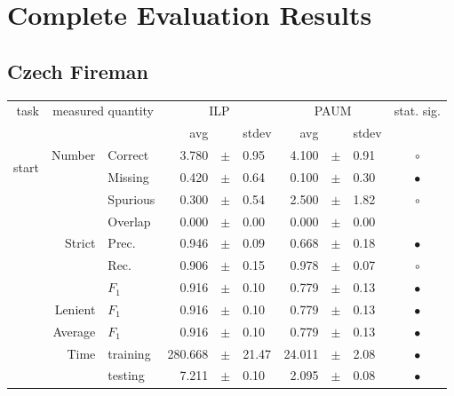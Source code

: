 \appendix
\chapter{Complete Evaluation Results}

\section{Czech Fireman}

\begin{longtable}{|r|r|l||rcl|rcl|c|}
\hline
\multirow{2}{*}{task} & \multicolumn{2}{|c||}{\multirow{2}{*}{measured quantity}} & \multicolumn{3}{|c|}{ILP} & \multicolumn{3}{|c|}{PAUM} & \multirow{2}{*}{ stat. sig.}\\
\cline{4-9}
  & \multicolumn{2}{|c||}{} &  avg  &    &  stdev  &  avg  &    &  stdev  & \\
\hline
\endhead
\hline
\hline
\multirow{11}{*}{\begin{sideways}start\end{sideways} } 
& \multirow{4}{*}{Number} &  Correct  & 3.780 &  $\pm$  & 0.95 & 4.100 &  $\pm$  & 0.91 &  $\circ$\\
\cline{3-10}
 &  &  Missing  & 0.420 &  $\pm$  & 0.64 & 0.100 &  $\pm$  & 0.30 &  $\bullet$\\
\cline{3-10}
 &  &  Spurious  & 0.300 &  $\pm$  & 0.54 & 2.500 &  $\pm$  & 1.82 &  $\circ$\\
\cline{3-10}
 &  &  Overlap  & 0.000 &  $\pm$  & 0.00 & 0.000 &  $\pm$  & 0.00 &   \\
\cline{2-10}
 & \multirow{3}{*}{Strict} &  Prec.  & 0.946 &  $\pm$  & 0.09 & 0.668 &  $\pm$  & 0.18 &  $\bullet$\\
\cline{3-10}
 &  &  Rec.  & 0.906 &  $\pm$  & 0.15 & 0.978 &  $\pm$  & 0.07 &  $\circ$\\
\cline{3-10}
 &  &  $F_1$  & 0.916 &  $\pm$  & 0.10 & 0.779 &  $\pm$  & 0.13 &  $\bullet$\\
\cline{2-10}
 & Lenient &  $F_1$  & 0.916 &  $\pm$  & 0.10 & 0.779 &  $\pm$  & 0.13 &  $\bullet$\\
\cline{2-10}
 & Average &  $F_1$  & 0.916 &  $\pm$  & 0.10 & 0.779 &  $\pm$  & 0.13 &  $\bullet$\\
\cline{2-10}
 & \multirow{2}{*}{Time} &  training  & 280.668 &  $\pm$  & 21.47 & 24.011 &  $\pm$  & 2.08 &  $\bullet$\\
\cline{3-10}
 &  &  testing  & 7.211 &  $\pm$  & 0.10 & 2.095 &  $\pm$  & 0.08 &  $\bullet$\\
\hline
\hline

\end{longtable}
